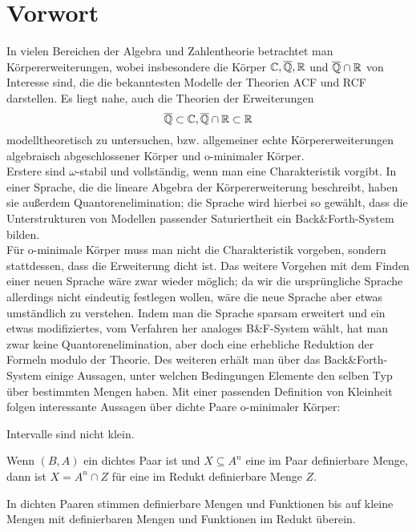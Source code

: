 \chapter*{Vorwort}
In vielen Bereichen der Algebra und Zahlentheorie betrachtet man Körpererweiterungen, wobei insbesondere die Körper $\mathbb{C},\overline{\mathbb{Q}},\mathbb{R}$ und $\overline{\mathbb{Q}}\cap\mathbb{R}$ von Interesse sind, die die bekanntesten Modelle der Theorien ACF und RCF darstellen. Es liegt nahe, auch die Theorien der Erweiterungen $$\overline{\mathbb{Q}}\subset\mathbb{C},\overline{\mathbb{Q}}\cap\mathbb{R}\subset\mathbb{R}$$ modelltheoretisch zu untersuchen, bzw. allgemeiner echte Körpererweiterungen algebraisch abgeschlossener Körper und o-minimaler Körper.\\
Erstere sind $\omega$-stabil und vollständig, wenn man eine Charakteristik vorgibt. In einer Sprache, die die lineare Abgebra der Körpererweiterung beschreibt, haben sie außerdem Quantorenelimination; die Sprache wird hierbei so gewählt, dass die Unterstrukturen von Modellen passender Saturiertheit ein Back\&Forth-System bilden.\\
Für o-minimale Körper muss man nicht die Charakteristik vorgeben, sondern stattdessen, dass die Erweiterung dicht ist. Das weitere Vorgehen mit dem Finden einer neuen Sprache wäre zwar wieder möglich; da wir die ursprüngliche Sprache allerdings nicht eindeutig festlegen wollen, wäre die neue Sprache aber etwas umständlich zu verstehen. Indem man die Sprache sparsam erweitert und ein etwas modifiziertes, vom Verfahren her analoges B\&F-System wählt, hat man zwar keine Quantorenelimination, aber doch eine erhebliche Reduktion der Formeln modulo der Theorie. Des weiteren erhält man über das Back\&Forth-System einige Aussagen, unter welchen Bedingungen Elemente den selben Typ über bestimmten Mengen haben. Mit einer passenden Definition von Kleinheit folgen interessante Aussagen über dichte Paare o-minimaler Körper:
\begin{satzleer}
	Intervalle sind nicht klein.
\end{satzleer}

\begin{satzleer}
	Wenn $(B,A)$ ein dichtes Paar ist und $X\subseteq A^n$ eine im Paar definierbare Menge, dann ist $X=A^n\cap Z$ für eine im Redukt definierbare Menge $Z$.
\end{satzleer}

\begin{satzleer}
	In dichten Paaren stimmen definierbare Mengen und Funktionen bis auf kleine Mengen mit definierbaren Mengen und Funktionen im Redukt überein.
\end{satzleer}

